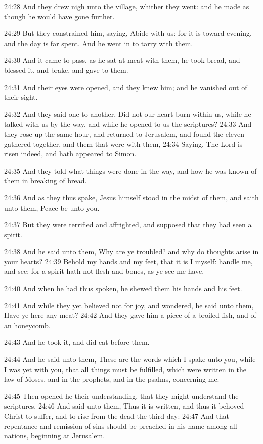 24:28 And they drew nigh unto the village, whither they went: and he made as though he would have gone further.

24:29 But they constrained him, saying, Abide with us: for it is toward evening, and the day is far spent. And he went in to tarry with them.

24:30 And it came to pass, as he sat at meat with them, he took bread, and blessed it, and brake, and gave to them.

24:31 And their eyes were opened, and they knew him; and he vanished out of their sight.

24:32 And they said one to another, Did not our heart burn within us, while he talked with us by the way, and while he opened to us the scriptures?  24:33 And they rose up the same hour, and returned to Jerusalem, and found the eleven gathered together, and them that were with them, 24:34 Saying, The Lord is risen indeed, and hath appeared to Simon.

24:35 And they told what things were done in the way, and how he was known of them in breaking of bread.

24:36 And as they thus spake, Jesus himself stood in the midst of them, and saith unto them, Peace be unto you.

24:37 But they were terrified and affrighted, and supposed that they had seen a spirit.

24:38 And he said unto them, Why are ye troubled? and why do thoughts arise in your hearts?  24:39 Behold my hands and my feet, that it is I myself: handle me, and see; for a spirit hath not flesh and bones, as ye see me have.

24:40 And when he had thus spoken, he shewed them his hands and his feet.

24:41 And while they yet believed not for joy, and wondered, he said unto them, Have ye here any meat?  24:42 And they gave him a piece of a broiled fish, and of an honeycomb.

24:43 And he took it, and did eat before them.

24:44 And he said unto them, These are the words which I spake unto you, while I was yet with you, that all things must be fulfilled, which were written in the law of Moses, and in the prophets, and in the psalms, concerning me.

24:45 Then opened he their understanding, that they might understand the scriptures, 24:46 And said unto them, Thus it is written, and thus it behoved Christ to suffer, and to rise from the dead the third day: 24:47 And that repentance and remission of sins should be preached in his name among all nations, beginning at Jerusalem.

